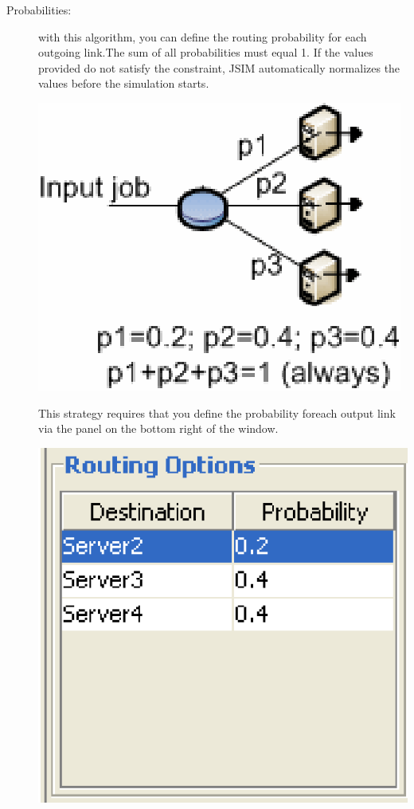 \begin{description}
\item[Probabilities:] with this algorithm, you can define the routing probability for each outgoing link.The sum of all probabilities must equal 1. If the values provided do not satisfy the constraint, JSIM automatically normalizes the values before the simulation starts.
\begin{center}
\includegraphics[scale=.5]{img/jsim/probability.eps}
\end{center}
This strategy requires that you define the probability foreach output link via the panel on the bottom right of the window.
\begin{center}
\includegraphics[scale=.5]{img/jsim/prob1.eps}

\end{center}
\end{description}
